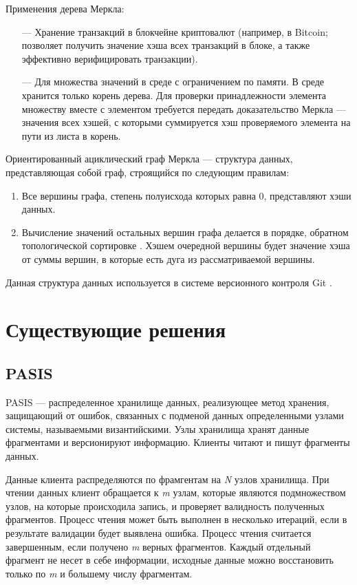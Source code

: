 Применения дерева Меркла:
\begin{itemize}
    \item[---] Хранение транзакций в блокчейне криптовалют (например, в Bitcoin; позволяет получить значение хэша всех транзакций в блоке, а также эффективно верифицировать транзакции).
    \item[---] Для множества значений в среде с ограничением по памяти. В среде хранится только корень дерева. Для проверки принадлежности элемента множеству вместе с элементом требуется передать доказательство Меркла --- значения всех хэшей, с которыми суммируется хэш проверяемого элемента на пути из листа в корень.
\end{itemize}

Ориентированный ациклический граф Меркла \cite{merkledag} --- структура данных, представляющая собой граф, строящийся по следующим правилам:
\begin{enumerate}
    \item Все вершины графа, степень полуисхода \cite{graphs} которых равна 0, представляют хэши данных.
    \item Вычисление значений остальных вершин графа делается в порядке, обратном топологической сортировке \cite{topsort}. Хэшем очередной вершины будет значение хэша от суммы вершин, в которые есть дуга из рассматриваемой вершины.
\end{enumerate}

%
Данная структура данных используется в системе версионного контроля Git \cite{git}.

\section{Существующие решения}

\subsection{PASIS}

\label{par:pasis}

PASIS \cite{pasis} --- распределенное хранилище данных, реализующее метод хранения, защищающий от ошибок, связанных с подменой данных определенными узлами системы, называемыми византийскими. Узлы хранилища хранят данные фрагментами и версионируют информацию. Клиенты читают и пишут фрагменты данных.

Данные клиента распределяются по фрамгентам на \textit{N} узлов хранилища. При чтении данных клиент обращается к \textit{m} узлам, которые являются подмножеством узлов, на которые происходила запись, и проверяет валидность полученных фрагментов. Процесс чтения может быть выполнен в несколько итераций, если в результате валидации будет выявлена ошибка. Процесс чтения считается завершенным, если получено \textit{m} верных фрагментов. Каждый отдельный фрагмент не несет в себе информации, исходные данные можно восстановить только по \textit{m} и большему числу фрагментам.

